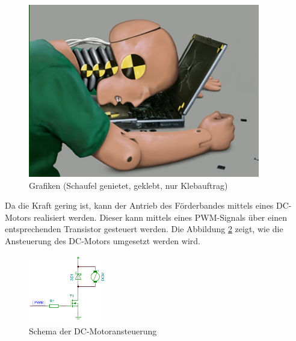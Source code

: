 \begin{figure}
	\centering
	\includegraphics[width=0.9\textwidth]{Enddokumentation/CrashTestDummy.jpg}
	\caption{Grafiken (Schaufel genietet, geklebt, nur Klebauftrag)}
	\label{fig:Grafiken (Schaufel genietet, geklebt, nur Klebauftrag)}	
\end{figure}

Da die Kraft gering ist, kann der Antrieb des Förderbandes mittels eines DC-Motors realisiert werden. Dieser kann mittels eines PWM-Signals über einen entsprechenden Transistor gesteuert werden. Die Abbildung \ref{fig:Schema_DC-Motor} zeigt, wie die Ansteuerung des DC-Motors umgesetzt werden wird.
	\begin{figure}[h!] %
		\centering
		\includegraphics[width=0.3\textwidth]{Enddokumentation/Loesungskonzept/Bilder/SchemaDcMotor.png}
		\caption{Schema der DC-Motoransteuerung}
		\label{fig:Schema_DC-Motor}
	\end{figure}